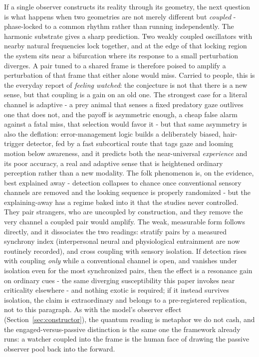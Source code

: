 If a single observer constructs its reality through its geometry, the next question is what happens when two geometries are not merely different but \textit{coupled} - phase-locked to a common rhythm rather than running independently. The harmonic substrate gives a sharp prediction. Two weakly coupled oscillators with nearby natural frequencies lock together, and at the edge of that locking region the system sits near a bifurcation where its response to a small perturbation diverges. A pair tuned to a shared frame is therefore poised to amplify a perturbation of that frame that either alone would miss. Carried to people, this is the everyday report of \textit{feeling watched}: the conjecture is not that there is a new sense, but that coupling is a gain on an old one. The strongest case for a literal channel is adaptive - a prey animal that senses a fixed predatory gaze outlives one that does not, and the payoff is asymmetric enough, a cheap false alarm against a fatal miss, that selection would favor it - but that same asymmetry is also the deflation: error-management logic builds a deliberately biased, hair-trigger detector, fed by a fast subcortical route that tags gaze and looming motion below awareness, and it predicts both the near-universal \textit{experience} and its poor accuracy, a real and adaptive sense that is heightened ordinary perception rather than a new modality. The folk phenomenon is, on the evidence, best explained away - detection collapses to chance once conventional sensory channels are removed and the looking sequence is properly randomized - but the explaining-away has a regime baked into it that the studies never controlled. They pair strangers, who are uncoupled by construction, and they remove the very channel a coupled pair would amplify. The weak, measurable form follows directly, and it dissociates the two readings: stratify pairs by a measured synchrony index (interpersonal neural and physiological entrainment are now routinely recorded), and cross coupling with sensory isolation. If detection rises with coupling \emph{only} while a conventional channel is open, and vanishes under isolation even for the most synchronized pairs, then the effect is a resonance gain on ordinary cues - the same diverging susceptibility this paper invokes near criticality elsewhere - and nothing exotic is required; if it instead survives isolation, the claim is extraordinary and belongs to a pre-registered replication, not to this paragraph. As with the model's observer effect (Section~\ref{sec:constructor}), the quantum reading is metaphor we do not cash, and the engaged-versus-passive distinction is the same one the framework already runs: a watcher coupled into the frame is the human face of drawing the passive observer pool back into the forward.


